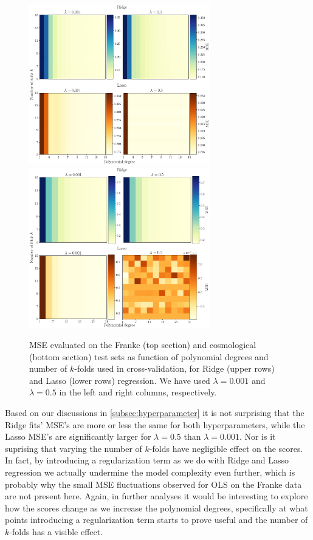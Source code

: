 \documentclass[aps,pra,english,notitlepage,reprint,nofootinbib]{revtex4-1}  %
\begin{document}
\begin{figure}
  \centering %
  \includegraphics[width=0.7\textwidth]{../figs/f_Ridge_Lasso.pdf}
  \centering
  \includegraphics[width=0.7\textwidth]{../figs/g_Ridge_Lasso.pdf}
  \caption{MSE evaluated on the Franke (top section) and cosmological (bottom section) test sets as function of polynomial degrees and number of $k$-folds used in cross-validation, for Ridge (upper rows) and Lasso (lower rows) regression. We have used $\lambda=0.001$ and $\lambda=0.5$ in the left and right columns, respectively.}\label{fig:kfold Ridge Lasso}
\end{figure}

Based on our discussions in \cref{subsec:hyperparameter} it is not surprising that the Ridge fits' MSE's are more or less the same for both hyperparameters, while the Lasso MSE's are significantly larger for $\lambda=0.5$ than $\lambda=0.001$. Nor is it suprising that varying the number of $k$-folds have negligible effect on the scores. In fact, by introducing a regularization term as we do with Ridge and Lasso regression we actually undermine the model complexity even further, which is probably why the small MSE fluctuations observed for OLS on the Franke data are not present here. Again, in further analyses it would be interesting to explore how the scores change as we increase the polynomial degrees, specifically at what points introducing a regularization term starts to prove useful and the number of $k$-folds has a visible effect.
\end{document}

